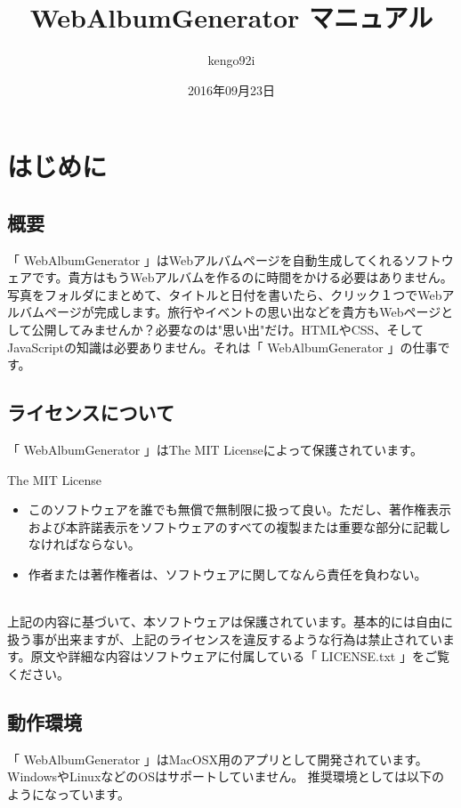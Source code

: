 \documentclass[]{jsarticle}
\title{WebAlbumGenerator マニュアル}
\author{kengo92i}
\date{2016年09月23日}
\begin{document}
\maketitle







\section{はじめに}

\subsection{概要}
「 WebAlbumGenerator 」はWebアルバムページを自動生成してくれるソフトウェアです。貴方はもうWebアルバムを作るのに時間をかける必要はありません。写真をフォルダにまとめて、タイトルと日付を書いたら、クリック１つでWebアルバムページが完成します。旅行やイベントの思い出などを貴方もWebページとして公開してみませんか？必要なのは"思い出"だけ。HTMLやCSS、そしてJavaScriptの知識は必要ありません。それは「 WebAlbumGenerator 」の仕事です。

\subsection{ライセンスについて}
「 WebAlbumGenerator 」はThe MIT Licenseによって保護されています。\\

\begin{itembox}[l]{The MIT License}
 \begin{itemize}
   \item このソフトウェアを誰でも無償で無制限に扱って良い。ただし、著作権表示および本許諾表示をソフトウェアのすべての複製または重要な部分に記載しなければならない。
   \item 作者または著作権者は、ソフトウェアに関してなんら責任を負わない。
 \end{itemize}
\end{itembox} \\

上記の内容に基づいて、本ソフトウェアは保護されています。基本的には自由に扱う事が出来ますが、上記のライセンスを違反するような行為は禁止されています。原文や詳細な内容はソフトウェアに付属している「 LICENSE.txt 」をご覧ください。

\subsection{動作環境}
「 WebAlbumGenerator 」はMacOSX用のアプリとして開発されています。WindowsやLinuxなどのOSはサポートしていません。
推奨環境としては以下のようになっています。\\
\end{document}
